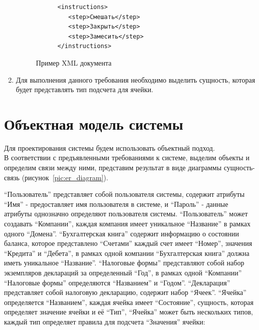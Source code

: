 \documentclass[14pt,a4paper]{reportmod}
\begin{document}
\begin{enumerate}
\begin{figure}
\begin{small}
\begin{verbatim}
      <instructions>
         <step>Смешать</step>
         <step>Закрыть</step>
         <step>Замесить</step>
      </instructions>
    \end{verbatim}
  \end{small}
  \caption{Пример XML документа}
  \label{pic:xml_sample}
\end{figure}
  \item Для выполнения данного требования необходимо выделить сущность, которая будет представлять тип подсчета для ячейки.
\end{enumerate}

\section{Объектная модель системы}
Для проектирования системы будем использовать объектный подход.\\
В соответствии с предъявленными требованиями к системе, выделим объекты и определим связи между ними, представим результат в виде диаграммы сущность-связь (рисунок~\ref{pic:er_diagram}).

``Пользователь'' представляет собой пользователя системы, содержит атрибуты ``Имя'' - предоставляет имя пользователя в системе, и ``Пароль'' - данные атрибуты однозначно определяют пользователя системы. ``Пользователь'' может создавать ``Компании'', каждая компания имеет уникальное ``Название'' в рамках одного ``Домена''. ``Бухгалтерская книга'' содержит информацию о состоянии баланса, которое представлено ``Счетами'' каждый счет имеет ``Номер'', значения ``Кредита'' и ``Дебета'', в рамках одной компании ``Бухгалтерская книга'' должна иметь уникальное ``Название''. ``Налоговые формы'' представляют собой набор экземпляров деклараций за определенный ``Год'', в рамках одной ``Компании'' ``Налоговые формы'' определяются ``Названием'' и ``Годом''. ``Декларация'' представляет собой налоговую декларацию, содержит набор ``Ячеек''. ``Ячейка'' определяется ``Названием'', каждая ячейка имеет ``Состояние'', сущность, которая определяет значение ячейки и её ``Тип'', ``Ячейка'' может быть нескольких типов, каждый тип определяет правила для подсчета ``Значения'' ячейки:
\end{document}
